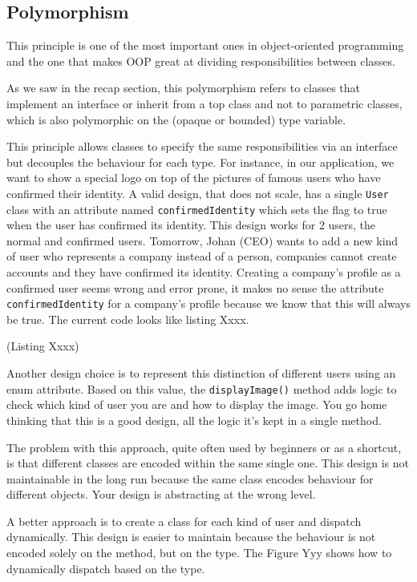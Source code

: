 \documentclass[]{article}
\begin{document}
\subsection{Polymorphism}\label{polymorphism}

This principle is one of the most important ones in object-oriented
programming and the one that makes OOP great at dividing
responsibilities between classes.

As we saw in the recap section, this polymorphism refers to classes that
implement an interface or inherit from a top class and not to parametric
classes, which is also polymorphic on the (opaque or bounded) type
variable.

This principle allows classes to specify the same responsibilities via
an interface but decouples the behaviour for each type. For instance, in
our application, we want to show a special logo on top of the pictures
of famous users who have confirmed their identity. A valid design, that
does not scale, has a single \texttt{User} class with an attribute named
\texttt{confirmedIdentity} which sets the flag to true when the user has
confirmed its identity. This design works for 2 users, the normal and
confirmed users. Tomorrow, Johan (CEO) wants to add a new kind of user
who represents a company instead of a person, companies cannot create
accounts and they have confirmed its identity. Creating a company's
profile as a confirmed user seems wrong and error prone, it makes no
sense the attribute \texttt{confirmedIdentity} for a company's profile
because we know that this will always be true. The current code looks
like listing Xxxx.

(Listing Xxxx)

Another design choice is to represent this distinction of different
users using an enum attribute. Based on this value, the
\texttt{displayImage()} method adds logic to check which kind of user
you are and how to display the image. You go home thinking that this is
a good design, all the logic it's kept in a single method.

The problem with this approach, quite often used by beginners or as a
shortcut, is that different classes are encoded within the same single
one. This design is not maintainable in the long run because the same
class encodes behaviour for different objects. Your design is
abstracting at the wrong level.

A better approach is to create a class for each kind of user and
dispatch dynamically. This design is easier to maintain because the
behaviour is not encoded solely on the method, but on the type. The
Figure Yyy shows how to dynamically dispatch based on the type.
\end{document}
